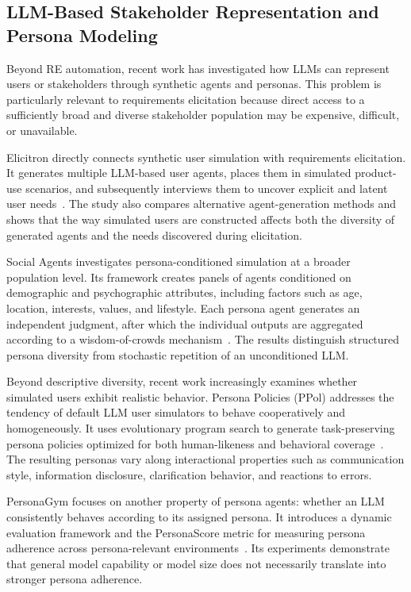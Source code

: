\subsection{LLM-Based Stakeholder Representation and Persona Modeling}
\label{sec:rw-persona}

Beyond RE automation, recent work has investigated how LLMs can represent users or stakeholders through synthetic agents and personas. This problem is particularly relevant to requirements elicitation because direct access to a sufficiently broad and diverse stakeholder population may be expensive, difficult, or unavailable.

Elicitron directly connects synthetic user simulation with requirements elicitation. It generates multiple LLM-based user agents, places them in simulated product-use scenarios, and subsequently interviews them to uncover explicit and latent user needs~\cite{ataei2025elicitron}. The study also compares alternative agent-generation methods and shows that the way simulated users are constructed affects both the diversity of generated agents and the needs discovered during elicitation.

Social Agents investigates persona-conditioned simulation at a broader population level. Its framework creates panels of agents conditioned on demographic and psychographic attributes, including factors such as age, location, interests, values, and lifestyle. Each persona agent generates an independent judgment, after which the individual outputs are aggregated according to a wisdom-of-crowds mechanism~\cite{bhattacharyya2026social}. The results distinguish structured persona diversity from stochastic repetition of an unconditioned LLM.

Beyond descriptive diversity, recent work increasingly examines whether simulated users exhibit realistic behavior. Persona Policies (PPol) addresses the tendency of default LLM user simulators to behave cooperatively and homogeneously. It uses evolutionary program search to generate task-preserving persona policies optimized for both human-likeness and behavioral coverage~\cite{chopra2026beyond}. The resulting personas vary along interactional properties such as communication style, information disclosure, clarification behavior, and reactions to errors.

PersonaGym focuses on another property of persona agents: whether an LLM consistently behaves according to its assigned persona. It introduces a dynamic evaluation framework and the PersonaScore metric for measuring persona adherence across persona-relevant environments~\cite{samuel2025personagym}. Its experiments demonstrate that general model capability or model size does not necessarily translate into stronger persona adherence.

